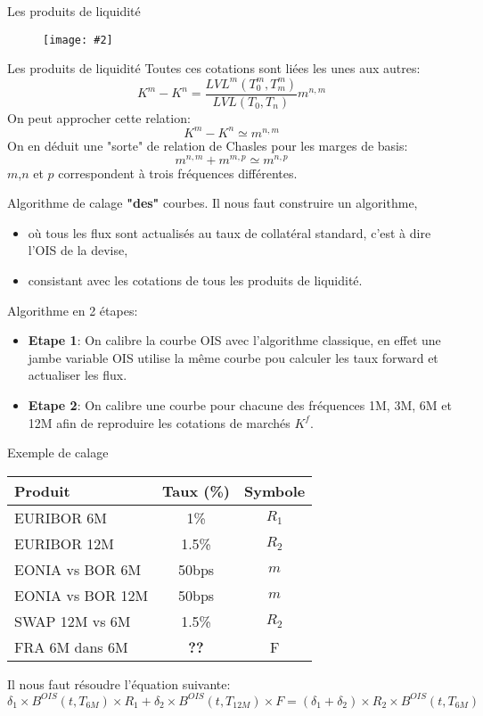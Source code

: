 \documentclass{beamer}
\newcommand{\FIG}[2]{\texttt{[image: \#2]}}
\begin{document}
\begin{frame}{Les produits de liquidité}
\begin{figure}[h]
\vspace{2mm}
\FIG{12cm}{figures/basis.png} 
\vspace{1mm}
\end{figure}
\end{frame}

\begin{frame}{Les produits de liquidité}
Toutes ces cotations sont liées les unes aux autres:\\
\[
K^m-K^n=\frac{LVL^m(T^m_0,T^m_m)}{LVL(T_0,T_n)} m^{n,m}
\]
On peut approcher cette relation:
\[
K^m-K^n \simeq m^{n,m}
\]
On en déduit une "sorte" de relation de Chasles pour les marges de basis:
\[
m^{n,m}+m^{m,p} \simeq m^{n,p}
\]
$m$,$n$ et $p$ correspondent à trois fréquences différentes.
\end{frame}

\begin{frame}{Algorithme de calage \textbf{"des"} courbes.}
Il nous faut construire un algorithme, 
\begin{itemize}
\item où tous les flux sont actualisés au taux de collatéral standard, c'est à dire l'OIS de la devise,
\item consistant avec les cotations de tous les produits de liquidité.
\end{itemize}
\vspace{0.5cm}
Algorithme en 2 étapes:
\begin{itemize}
\item \textbf{Etape 1}: On calibre la courbe OIS avec l'algorithme classique, en effet une jambe variable OIS utilise la même courbe pou calculer les taux forward et actualiser les flux.
\item \textbf{Etape 2}: On calibre une courbe pour chacune des fréquences 1M, 3M, 6M et 12M afin de reproduire les cotations de marchés $K^f$.
\end{itemize}
\end{frame}

\begin{frame}{Exemple de calage}
\begin{center}
\begin{tabular}{|l|c|c|}
\hline
Produit & Taux (\%) & Symbole\\
\hline
EURIBOR 6M & 1\% & $R_1$ \\
EURIBOR 12M & 1.5\% & $R_2$ \\
EONIA vs BOR 6M & 50bps & $m$\\
EONIA vs BOR 12M & 50bps & $m$\\
SWAP 12M vs 6M & 1.5\% & $R_2$ \\
FRA 6M dans 6M & \textbf{??} & F \\
\hline
\end{tabular}
\end{center}
Il nous faut résoudre l'équation suivante:
\small
\[
\delta_1 \times B^{OIS}(t,T_{6M}) \times R_1 + \delta_2 \times B^{OIS}(t,T_{12M}) \times F = (\delta_1 + \delta_2) \times R_2 \times B^{OIS}(t,T_{6M})
\]
\end{frame}
\end{document}
